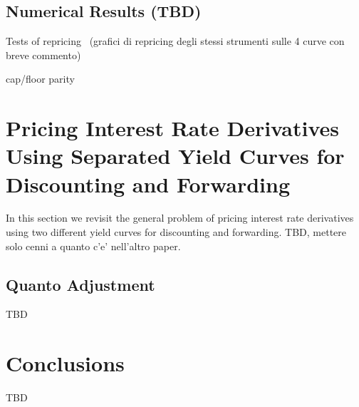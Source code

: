 \documentclass[11pt,reqno]{amsart}
\begin{document}
\subsection{Numerical Results (TBD)}
Tests of repricing \ (grafici di repricing degli stessi strumenti sulle 4
curve con breve commento)

cap/floor parity


\section{\label{SecPricing2curves}Pricing Interest Rate Derivatives Using Separated Yield Curves for
Discounting and Forwarding}
In this section we revisit the general problem of pricing interest rate derivatives using two different yield curves for discounting and forwarding.
TBD, mettere solo cenni a quanto c'e' nell'altro paper.


\subsection{Quanto Adjustment}
TBD


\section{\label{SecConclusions}Conclusions}

TBD




\end{document}
